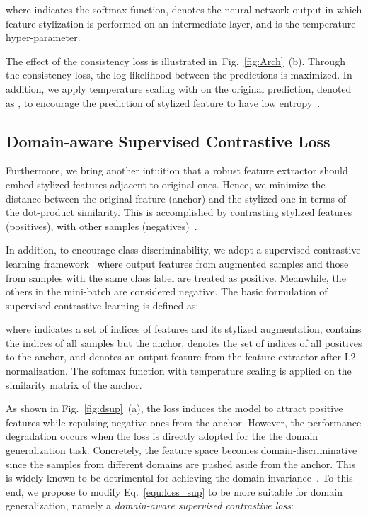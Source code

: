 \documentclass[sigconf]{acmart}
\newcommand{\Fref}[1]{Fig.~\ref{#1}}
\begin{document}
where  indicates the softmax function,  denotes the neural network output in which feature stylization is performed on an intermediate layer, and  is the temperature hyper-parameter.

The effect of the consistency loss is illustrated in~\Fref{fig:Arch}~(b). Through the consistency loss, the log-likelihood between the predictions is maximized. In addition, we apply temperature scaling with  on the original prediction, denoted as , to encourage the prediction of stylized feature to have low entropy~\cite{grandvalet2004semi, hinton2015distilling}. 

\subsection{Domain-aware Supervised Contrastive Loss}
Furthermore, we bring another intuition that a robust feature extractor should embed stylized features adjacent to original ones. Hence, we minimize the distance between the original feature (anchor) and the stylized one in terms of the dot-product similarity. This is accomplished by contrasting stylized features (positives), with other samples (negatives)~\cite{he2020momentum}. 

In addition, to encourage class discriminability, we adopt a supervised contrastive learning framework~\cite{khosla2020supervised} where output features from augmented samples and those from samples with the same class label are treated as positive. Meanwhile, the others in the mini-batch are considered negative.
The basic formulation of supervised contrastive learning is defined as:

where  indicates a set of indices of features and its stylized augmentation,  contains the indices of all samples but the anchor,  denotes the set of indices of all positives to the anchor, and  denotes an output feature from the feature extractor  after L2 normalization. The softmax function with temperature scaling is applied on the similarity matrix of the anchor.

As shown in \Fref{fig:dsup}~(a), the loss induces the model to attract positive features while repulsing negative ones from the anchor.
However, the performance degradation occurs when the loss is directly adopted for the the domain generalization task. Concretely, the feature space becomes domain-discriminative since the samples from different domains are pushed aside from the anchor. This is widely known to be detrimental for achieving the domain-invariance~\cite{daume2009frustratingly, sun2016return, tzeng2017adversarial, li2018domain}.
To this end, we propose to modify Eq.~\eqref{equ:loss_sup} to be more suitable for domain generalization, namely a \textit{domain-aware supervised contrastive loss}:
\end{document}
